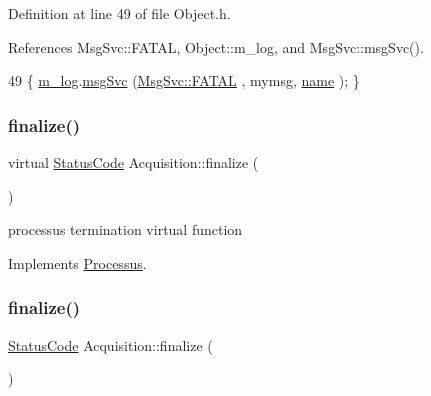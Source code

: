 Definition at line 49 of file Object.\+h.



References Msg\+Svc\+::\+F\+A\+T\+AL, Object\+::m\+\_\+log, and Msg\+Svc\+::msg\+Svc().


\begin{DoxyCode}
49 \{ \hyperlink{classObject_a0d269813dd7ac1f24bc143031e2963f2}{m\_log}.\hyperlink{classMsgSvc_ad25f18047920cc59a314e5098259711c}{msgSvc} (\hyperlink{classMsgSvc_ae671eb7301996cd049d2da8a65925926a59c73cb29edfc9cdf35845e2b1301363}{MsgSvc::FATAL}   , mymsg, \hyperlink{classObject_a300f4c05dd468c7bb8b3c968868443c1}{name} ); \}
\end{DoxyCode}
\mbox{\label{classAcquisition_a92b4b55e8c7d53610e7eda6d5b9c74a4}} 
\subsubsection{\texorpdfstring{finalize()}{finalize()}\hspace{0.1cm}{\footnotesize\ttfamily [1/2]}}
{\footnotesize\ttfamily virtual \hyperlink{classStatusCode}{Status\+Code} Acquisition\+::finalize (\begin{DoxyParamCaption}{ }\end{DoxyParamCaption})\hspace{0.3cm}{\ttfamily [virtual]}}

processus termination virtual function 

Implements \hyperlink{classProcessus_aba93d691f031bdb18ae4b8afb1b2e856}{Processus}.

\mbox{\label{classAcquisition_ab8ffcd86548280f0403b3ae6338f2499}} 
\subsubsection{\texorpdfstring{finalize()}{finalize()}\hspace{0.1cm}{\footnotesize\ttfamily [2/2]}}
{\footnotesize\ttfamily \hyperlink{classStatusCode}{Status\+Code} Acquisition\+::finalize (\begin{DoxyParamCaption}{ }\end{DoxyParamCaption})\hspace{0.3cm}{\ttfamily [virtual]}}


